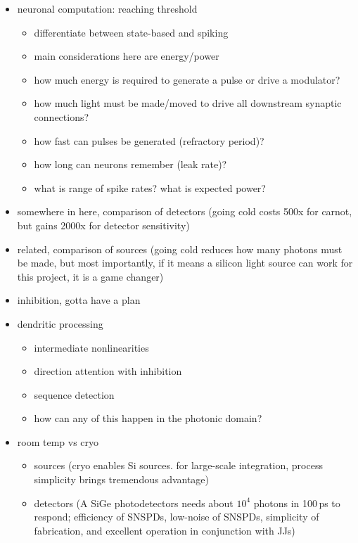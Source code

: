 \documentclass[twocolumn]{article}
\begin{document}
\begin{itemize}
\item neuronal computation: reaching threshold
\begin{itemize}
\item differentiate between state-based and spiking
\item main considerations here are energy/power
\item how much energy is required to generate a pulse or drive a modulator? 
\item how much light must be made/moved to drive all downstream synaptic connections? 
\item how fast can pulses be generated (refractory period)? 
\item how long can neurons remember (leak rate)? 
\item what is range of spike rates? what is expected power?
\end{itemize}

\item somewhere in here, comparison of detectors (going cold costs 500x for carnot, but gains 2000x for detector sensitivity)
\item related, comparison of sources (going cold reduces how many photons must be made, but most importantly, if it means a silicon light source can work for this project, it is a game changer)

\item inhibition, gotta have a plan

\item dendritic processing
\begin{itemize}
\item intermediate nonlinearities
\item direction attention with inhibition
\item sequence detection
\item how can any of this happen in the photonic domain?
\end{itemize}

\item room temp vs cryo
\begin{itemize}
\item sources (cryo enables Si sources. for large-scale integration, process simplicity brings tremendous advantage)
\item detectors (A SiGe photodetectors needs about $10^4$ photons in 100\,ps to respond; efficiency of SNSPDs, low-noise of SNSPDs, simplicity of fabrication, and excellent operation in conjunction with JJs)

\end{itemize}

\end{itemize}
\end{document}
